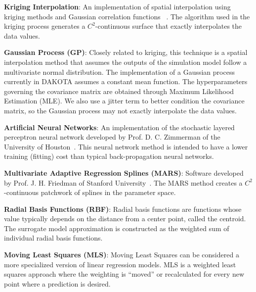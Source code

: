 \textbf{Kriging Interpolation}: An implementation of spatial
interpolation using kriging methods and Gaussian correlation functions
~\cite{Giu98}. The algorithm used in the kriging process generates a
$C^2$-continuous surface that exactly interpolates the data values.

\textbf{Gaussian Process (GP)}: Closely related to kriging, this
technique is a spatial interpolation method that assumes the outputs
of the simulation model follow a multivariate normal distribution.
The implementation of a Gaussian process currently in DAKOTA assumes
a constant mean function.  The hyperparameters governing the covariance
matrix are obtained through Maximum Likelihood Estimation (MLE). We also use
a jitter term to better condition the covariance matrix, so the Gaussian
process may not exactly interpolate the data values.

\textbf{Artificial Neural Networks}: An implementation of the
stochastic layered perceptron neural network developed by Prof. D. C.
Zimmerman of the University of Houston~\cite{Zim96}. This neural network
method is intended to have a lower training (fitting) cost than
typical back-propagation neural networks.

\textbf{Multivariate Adaptive Regression Splines (MARS)}: Software
developed by Prof. J. H. Friedman of Stanford University~\cite{Fri91}.
The MARS method creates a $C^2$-continuous patchwork of splines in the
parameter space.

\textbf{Radial Basis Functions (RBF)}:  Radial basis functions are 
functions whose value typically depends on the distance from a center point, 
called the centroid.  The surrogate model approximation is constructed
as the weighted sum of individual radial basis functions. 

\textbf{Moving Least Squares (MLS)}: Moving Least Squares can be 
considered a more specialized version of linear regression models.
MLS is a weighted least squares approach where the weighting is 
``moved'' or recalculated for every new point where 
a prediction is desired.~\cite{Nea04} 


